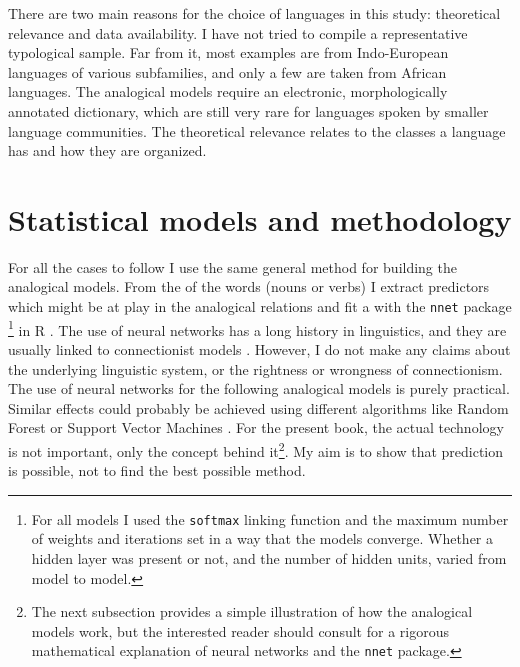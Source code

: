 There are two main reasons for the choice of languages in this study: theoretical relevance and data availability. I have not tried to compile a  representative typological sample. Far from it, most examples are from Indo-European languages of various subfamilies, and only a few are taken from African languages. The analogical models require an electronic, morphologically annotated dictionary, which are still very rare for languages spoken by smaller language communities. The theoretical relevance relates to the classes a language has and how they are organized.

\section{Statistical models and methodology}

\largerpage
For all the cases to follow I use the same general method for building the analogical models. From the  of the words (nouns or verbs) I extract predictors which might be at play in the analogical relations and fit a  with the \texttt{nnet} package \autocite{Venables.2002}\footnote{For all models I used the \texttt{softmax} linking function and the maximum number of weights and iterations set in a way that the models converge. Whether a hidden layer was present or not, and the number of hidden units, varied from model to model.} in R \autocite{RDevelopmentCoreTeam.2008}. The use of neural networks has a long history in linguistics, and they are usually linked to connectionist models \autocite{Bechtel.2002, Churchland.1989, McClelland.1986, Rumelhart.1986}. However, I do not make any claims about the underlying linguistic system, or the rightness or wrongness of connectionism. The use of neural networks for the following analogical models is purely practical. Similar effects could probably be achieved using different algorithms like Random Forest \autocite{Breiman.2001a} or Support Vector Machines \autocites{Smola.1998, Scholkopf.2001}. For the present book, the actual technology is not important, only the concept behind it\footnote{The next subsection provides a simple illustration of how the analogical models work, but the interested reader should consult \textcite{Venables.2002} for a rigorous mathematical explanation of neural networks and the \texttt{nnet} package.}. My aim is to show that prediction is possible, not to find the best possible method.

